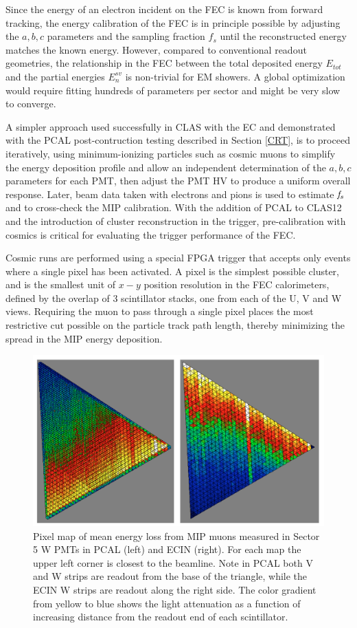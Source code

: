 Since the energy of an electron incident on the FEC is known from forward tracking, the energy calibration of the FEC is in principle possible by adjusting the $a,b,c$ parameters and the sampling fraction $f_{s}$ until the reconstructed energy matches the known energy.  However, compared to conventional readout geometries, the relationship in the FEC between the total deposited energy $E_{tot}$ and the partial energies $E_{n}^{sv}$ is non-trivial for EM showers.  A global optimization would require fitting hundreds of parameters per sector and might be very slow to converge.

A simpler approach used successfully in CLAS with the EC and demonstrated with the PCAL post-contruction testing described in Section \ref{CRT}, is to proceed iteratively, using minimum-ionizing particles such as cosmic muons to simplify the energy deposition profile and allow an independent determination of the $a,b,c$ parameters for each PMT, then adjust the PMT HV to produce a uniform overall response.  Later, beam data taken with electrons and pions is used to estimate $\it{f_s}$ and to cross-check the MIP calibration.  With the addition of PCAL to CLAS12 and the introduction of cluster reconstruction in the trigger, pre-calibration with cosmics is critical for evaluating the trigger performance of the FEC.

Cosmic runs are performed using a special FPGA trigger that accepts only events where a single pixel has been activated. A pixel is the simplest possible cluster, and is the smallest unit of $x-y$ position resolution in the FEC calorimeters, defined by the overlap of 3 scintillator stacks, one from each of the U, V and W views.  Requiring the muon to pass through a single pixel places the most restrictive cut possible on the particle track path length, thereby minimizing the spread in the MIP energy deposition.   
\begin{figure}[hbt]
\centering
\includegraphics[width=1.0\columnwidth,keepaspectratio]{img/S9_1_1.png}
\caption[]{Pixel map of mean energy loss from MIP muons measured in Sector 5 W PMTs in PCAL (left) and ECIN (right). For each map the upper left corner is closest to the beamline. Note in PCAL both V and W strips are readout from the base of the triangle, while the ECIN W strips are readout along the right side.  The color gradient from yellow to blue shows the light attenuation as a function of increasing distance from the readout end of each scintillator. }
\label{fig:S9_1_1}
\end{figure}

